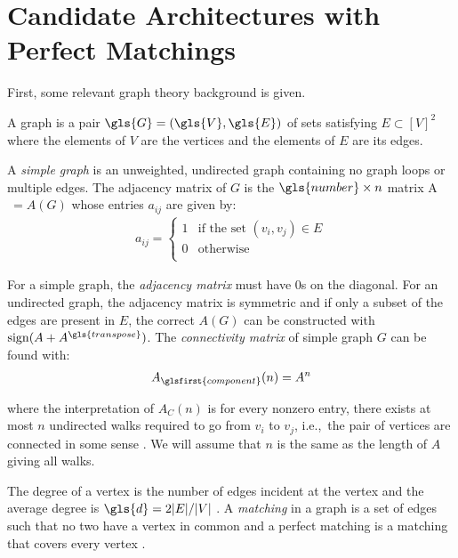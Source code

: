 \section{Candidate Architectures with Perfect Matchings \label{sec:ch2:candidates}}

First, some relevant graph theory background is given.

\begin{definition}[Graph] \label{def:ch2:graph}
A graph is a pair $\gls{G} = (\gls{V},\gls{E})$ of sets satisfying $E \subset [V]^2$ where the elements of $V$ are the vertices and the elements of $E$ are its edges. 
\end{definition}

A \textit{simple graph} is an unweighted, undirected graph containing no graph loops or multiple edges. 
The adjacency matrix of $G$ is the $\gls{number} \times n$ matrix \gls{A}$\ = A(G)$ whose entries $a_{ij}$ are given by:
\begin{align*}
a_{ij} = \begin{cases}
1 & \text{if the set $(v_i, v_j) \in E$} \\
0 & \text{otherwise} \\
\end{cases}
\end{align*}

\noindent For a simple graph, the \textit{adjacency matrix} must have 0s on the diagonal. For an undirected graph, the adjacency matrix is symmetric and if only a subset of the edges are present in $E$, the correct $A(G)$ can be constructed with $\mathrm{sign}(A + A^{\gls{transpose}})$. The \textit{connectivity matrix} of simple graph $G$ can be found with:
\begin{align} \label{eq:ch2:connectivity}
A_{\glsfirst{component}}(n) =  A^n
\end{align}

\noindent where the interpretation of $A_C(n)$ is for every nonzero entry, there exists at most $n$ undirected walks required to go from $v_i$ to $v_j$, i.e.,~the pair of vertices are connected in some sense \cite[p.~165]{Godsil2001a}. We will assume that $n$ is the same as the length of $A$ giving all walks. 

The degree of a vertex is the number of edges incident at the vertex and the average degree is $\gls{d} = 2 \abs*{E} / \abs*{V}$ \cite[p.~5]{Diestel2000a}. A \textit{matching} in a graph is a set of edges such that no two have a vertex in common and a perfect matching is a matching that covers every vertex \cite[p.~255]{Rispoli2007a}.


